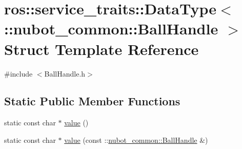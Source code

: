 \hypertarget{structros_1_1service__traits_1_1DataType_3_01_1_1nubot__common_1_1BallHandle_01_4}{\section{ros\-:\-:service\-\_\-traits\-:\-:Data\-Type$<$ \-:\-:nubot\-\_\-common\-:\-:Ball\-Handle $>$ Struct Template Reference}
\label{structros_1_1service__traits_1_1DataType_3_01_1_1nubot__common_1_1BallHandle_01_4}
}


{\ttfamily \#include $<$Ball\-Handle.\-h$>$}

\subsection*{Static Public Member Functions}
\begin{DoxyCompactItemize}
\item 
static const char $\ast$ \hyperlink{structros_1_1service__traits_1_1DataType_3_01_1_1nubot__common_1_1BallHandle_01_4_a194205d426022e6f60af35034bb1674f}{value} ()
\item 
static const char $\ast$ \hyperlink{structros_1_1service__traits_1_1DataType_3_01_1_1nubot__common_1_1BallHandle_01_4_ac9448b85ae585ed96238d15ad571eb1c}{value} (const \-::\hyperlink{structnubot__common_1_1BallHandle}{nubot\-\_\-common\-::\-Ball\-Handle} \&)
\end{DoxyCompactItemize}


